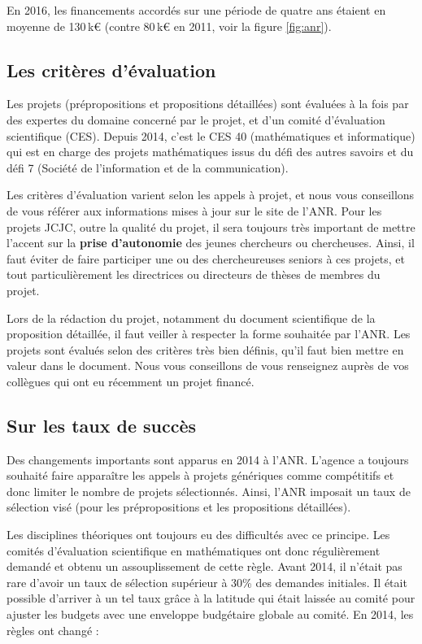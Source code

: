 En 2016, les financements accord\'es sur une p\'eriode de quatre ans \'etaient en moyenne de 130\,k\euro{} (contre 80\,k\euro{} en 2011, voir la figure \ref{fig:anr}).


\subsection*{Les crit\`eres d'\'evaluation}

Les projets (pr\'epropositions et propositions d\'etaill\'ees) sont \'evalu\'ees \`a la fois par des expert\mp e\mp s du domaine concern\'e par le projet, et d'un comit\'e d'\'evaluation scientifique (CES). Depuis 2014, c'est le CES 40 (math\'ematiques et informatique) qui est en charge des projets math\'ematiques issus du d\'efi des autres savoirs et du d\'efi 7 (Soci\'et\'e de l'information et de la communication).

Les crit\`eres d'\'evaluation varient selon les appels \`a projet, et nous vous conseillons de vous r\'ef\'erer aux informations mises \`a jour sur le site de l'ANR. Pour les projets JCJC, outre la qualit\'e du projet, il sera toujours tr\`es important de mettre l'accent sur la {\bf prise d'autonomie} des jeunes chercheurs ou chercheuses. Ainsi, il faut \'eviter de faire participer un\mp e ou des chercheur\mp euse\mp s seniors \`a ces projets, et tout particuli\`erement les directrices ou directeurs de th\`eses de membres du projet.

Lors de la r\'edaction du projet, notamment du document scientifique de la proposition d\'etaill\'ee, il faut veiller \`a respecter la forme souhait\'ee par l'ANR. Les projets sont \'evalu\'es selon des crit\`eres tr\`es bien d\'efinis, qu'il faut bien mettre en valeur dans le document. Nous vous conseillons de vous renseignez aupr\`es de vos coll\`egues qui ont eu r\'ecemment un projet financ\'e.

\subsection*{Sur les taux de succ\`es}

Des changements importants sont apparus en 2014 \`a l'ANR. L'agence a toujours souhait\'e faire appara\^itre les appels \`a projets g\'en\'eriques comme comp\'etitifs et donc limiter le nombre de projets s\'electionn\'es. Ainsi, l'ANR imposait un taux de s\'election vis\'e (pour les pr\'epropositions et les propositions d\'etaill\'ees).

Les disciplines th\'eoriques ont toujours eu des difficult\'es avec ce principe. Les comit\'es d'\'evaluation scientifique en math\'ematiques ont donc r\'eguli\`erement demand\'e et obtenu un assouplissement de cette r\`egle. Avant 2014, il n'\'etait pas rare d'avoir un taux de s\'election sup\'erieur \`a 30\% des demandes initiales. Il \'etait possible d'arriver \`a un tel taux gr\^ace \`a la latitude qui \'etait laiss\'ee au comit\'e pour ajuster les budgets avec une enveloppe budg\'etaire globale au comit\'e. En 2014, les r\`egles ont chang\'e :

